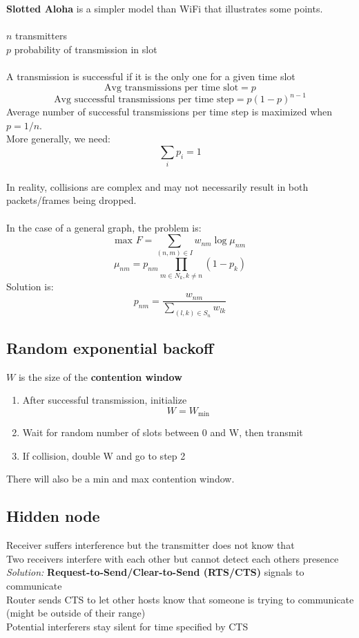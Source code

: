 \documentclass{article}
\begin{document}
\textbf{Slotted Aloha} is a simpler model than WiFi that illustrates some points.\\
\\
$n$ transmitters \\
$p$ probability of transmission in slot \\
\\
A transmission is successful if it is the only one for a given time slot
$$ \text{Avg transmissions per time slot} = p $$
$$ \text{Avg successful transmissions per time step} = p(1-p)^{n-1} $$
Average number of successful transmissions per time step is maximized when $p = 1/n$. \\
More generally, we need:
$$ \sum_i p_i = 1 $$
\\
In reality, collisions are complex and may not necessarily result in both packets/frames being dropped.\\
\\
In the case of a general graph, the problem is:
$$ \text{max } F = \sum_{(n,m) \in I} w_{nm} \log \mu_{nm} $$
$$ \mu_{nm} = p_{nm} \prod_{m \in N_k, k \neq n} (1 - p_k) $$
Solution is:
$$ p_{nm} = \frac{w_{nm}}{\sum_{(l,k) \in S_n} w_{lk}} $$

\subsection{Random exponential backoff}

$W$ is the size of the \textbf{contention window}
\begin{enumerate}
\item After successful transmission, initialize
$$ W = W_{\text{min}} $$
\item Wait for random number of slots between 0 and W, then transmit
\item If collision, double W and go to step 2
\end{enumerate}
There will also be a min and max contention window.

\subsection{Hidden node}

Receiver suffers interference but the transmitter does not know that \\
Two receivers interfere with each other but cannot detect each others presence \\
\textit{Solution:} \textbf{Request-to-Send/Clear-to-Send (RTS/CTS)} signals to communicate \\
Router sends CTS to let other hosts know that someone is trying to communicate (might be outside of their range)\\
Potential interferers stay silent for time specified by CTS
\end{document}
